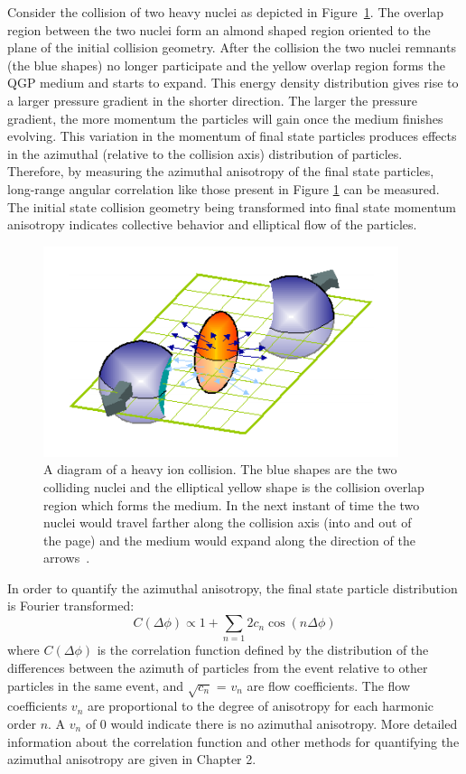 Consider the collision of two heavy nuclei as depicted in Figure~\ref{fig:flow_diagram_cart}. The overlap region between the two nuclei form an almond shaped region oriented to the plane of the initial collision geometry. After the collision the two nuclei remnants (the blue shapes) no longer participate and the yellow overlap region forms the QGP medium and starts to expand. This energy density distribution gives rise to a larger pressure gradient in the shorter direction. The larger the pressure gradient, the more momentum the particles will gain once the medium finishes evolving. This variation in the momentum of final state particles produces effects in the azimuthal (relative to the collision axis) distribution of particles. Therefore, by measuring the azimuthal anisotropy of the final state particles, long-range angular correlation like those present in Figure \ref{fig:flow_diagram_cart} can be measured. The initial state collision geometry being transformed into final state momentum anisotropy indicates collective behavior and elliptical flow of the particles.

\begin{figure}[!ht]
\centering
\includegraphics[width=0.5\linewidth]{figs/flow_diagram_cartoon.png}
\caption{A diagram of a heavy ion collision. The blue shapes are the two colliding nuclei and the elliptical yellow shape is the collision overlap region which forms the medium. In the next instant of time the two nuclei would travel farther along the collision axis (into and out of the page) and the medium would expand along the direction of the arrows~\cite{Qin:2015nma}.}
\label{fig:flow_diagram_cart}
\end{figure}

In order to quantify the azimuthal anisotropy, the final state particle distribution is Fourier transformed:
\begin{equation}\label{eqn:dndphi}
  C(\Delta\phi) \propto 1 + \sum_{n=1}2 c_{n}\cos(n\Delta\phi) 
\end{equation}
where $C(\Delta\phi)$ is the correlation function defined by the distribution of the differences between the azimuth of particles from the event relative to other particles in the same event, and $\sqrt{c_n}$ = $v_n$ are flow coefficients. The flow coefficients $v_n$ are proportional to the degree of anisotropy for each harmonic order $n$. A $v_n$ of 0 would indicate there is no azimuthal anisotropy. More detailed information about the correlation function and other methods for quantifying the azimuthal anisotropy are given in Chapter 2.

